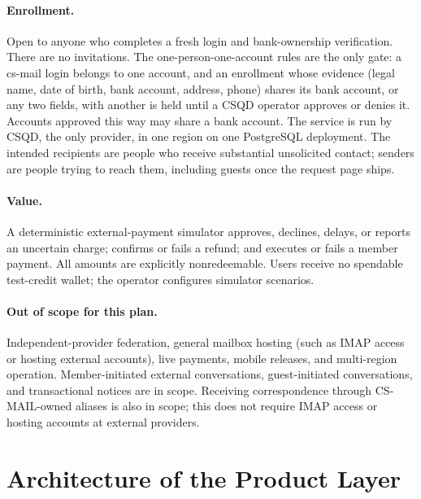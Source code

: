 \documentclass[11pt]{article}
\begin{document}
\paragraph{Enrollment.} Open to anyone who completes a fresh login and
bank-ownership verification. There are no invitations. The one-person-one-account
rules are the only gate: a cs-mail login belongs to one account, and an enrollment
whose evidence (legal name, date of birth, bank account, address, phone) shares its
bank account, or any two fields, with another is held until a CSQD operator approves
or denies it. Accounts approved this way may share a bank account. The service is run
by CSQD, the only provider, in one region on one PostgreSQL deployment. The
intended recipients are people who receive substantial unsolicited contact;
senders are people trying to reach them, including guests once the request page
ships.

\paragraph{Value.} A deterministic external-payment simulator approves,
declines, delays, or reports an uncertain charge; confirms or fails a refund; and
executes or fails a member payment. All amounts are explicitly nonredeemable.
Users receive no spendable test-credit wallet; the operator configures simulator
scenarios.

\paragraph{Out of scope for this plan.} Independent-provider federation,
general mailbox hosting (such as IMAP access or hosting external accounts), live
payments, mobile releases, and multi-region operation. Member-initiated external
conversations, guest-initiated conversations, and transactional notices are in scope.
Receiving correspondence through CS-MAIL-owned aliases is also in scope; this
does not require IMAP access or hosting accounts at external providers.

\section{Architecture of the Product Layer}
\end{document}
